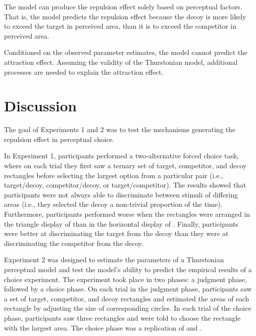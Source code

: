 The model can produce the repulsion effect solely based on perceptual factors. That is, the model predicts the repulsion effect because the decoy is more likely to exceed the target in perceived area, than it is to exceed the competitor in perceived area.

Conditioned on the observed parameter estimates, the model cannot predict the attraction effect. Assuming the validity of the Thurstonian model, additional processes are needed to explain the attraction effect.

\section{Discussion}

The goal of Experiments 1 and 2 was to test the mechanisms generating the repulsion effect in perceptual choice. 

In Experiment 1, participants performed a two-alternative forced choice task, where on each trial they first saw a ternary set of target, competitor, and decoy rectangles before selecting the largest option from a particular pair (i.e., target/decoy, competitor/decoy, or target/competitor). The results showed that participants were not always able to discriminate between stimuli of differing areas (i.e., they selected the decoy a non-trivial proportion of the time). Furthermore, participants performed worse when the rectangles were arranged in the triangle display of \textcite{spektorWhenGoodLooks2018b} than in the horizontal display of \textcite{trueblood2013not}. Finally, participants were better at discriminating the target from the decoy than they were at discriminating the competitor from the decoy.

Experiment 2 was designed to estimate the parameters of a Thurstonian perceptual model and test the model's ability to predict the empirical results of a choice experiment. The experiment took place in two phases: a judgment phase, followed by a choice phase. On each trial in the judgment phase, participants saw a set of target, competitor, and decoy rectangles and estimated the areas of each rectangle by adjusting the size of corresponding circles. In each trial of the choice phase, participants saw three rectangles and were told to choose the rectangle with the largest area. The choice phase was a replication of \textcite{trueblood2013not} and \textcite{spektorWhenGoodLooks2018b}. 

